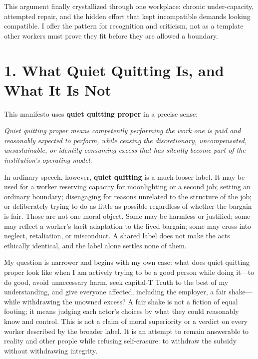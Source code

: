 \documentclass[11pt,oneside]{article}
\renewenvironment{quote}
  {\begin{tcolorbox}[
      enhanced,
      breakable,
      colback=ManifestLight,
      colframe=ManifestRule,
      boxrule=0pt,
      leftrule=3pt,
      arc=0pt,
      outer arc=0pt,
      left=10pt,right=10pt,top=8pt,bottom=8pt,
      before skip=0.8em,after skip=0.8em
    ]\itshape}
  {\end{tcolorbox}}
\begin{document}
This argument finally crystallized through one workplace: chronic
under-capacity, attempted repair, and the hidden effort that kept
incompatible demands looking compatible. I offer the pattern for
recognition and criticism, not as a template other workers must prove
they fit before they are allowed a boundary.

\hypertarget{what-quiet-quitting-is-and-what-it-is-not}{%
\section{1. What Quiet Quitting Is, and What It Is
Not}\label{what-quiet-quitting-is-and-what-it-is-not}}

This manifesto uses \textbf{quiet quitting proper} in a precise sense:

\begin{quote}
Quiet quitting proper means competently performing the work one is paid
and reasonably expected to perform, while ceasing the discretionary,
uncompensated, unsustainable, or identity-consuming excess that has
silently become part of the institution's operating model.
\end{quote}

In ordinary speech, however, \textbf{quiet quitting} is a much looser
label. It may be used for a worker reserving capacity for moonlighting
or a second job; setting an ordinary boundary; disengaging for reasons
unrelated to the structure of the job; or deliberately trying to do as
little as possible regardless of whether the bargain is fair. Those are
not one moral object. Some may be harmless or justified; some may
reflect a worker's tacit adaptation to the lived bargain; some may cross
into neglect, retaliation, or misconduct. A shared label does not make
the acts ethically identical, and the label alone settles none of them.

My question is narrower and begins with my own case: what does quiet
quitting proper look like when I am actively trying to be a good person
while doing it---to do good, avoid unnecessary harm, seek capital-T
Truth to the best of my understanding, and give everyone affected,
including the employer, a fair shake---while withdrawing the unowned
excess? A fair shake is not a fiction of equal footing; it means judging
each actor's choices by what they could reasonably know and control.
This is not a claim of moral superiority or a verdict on every worker
described by the broader label. It is an attempt to remain answerable to
reality and other people while refusing self-erasure: to withdraw the
subsidy without withdrawing integrity.
\end{document}

